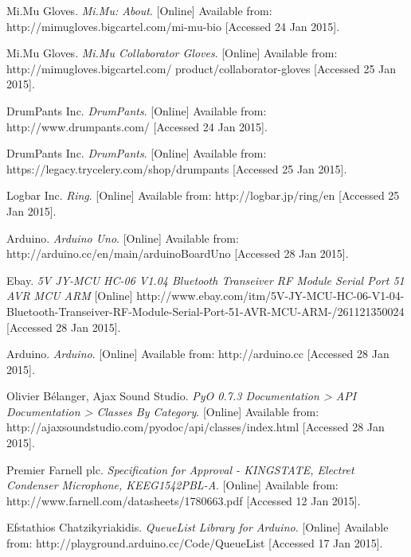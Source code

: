 
\begin{thebibliography}{99}

    Mi.Mu Gloves. \emph{Mi.Mu: About}. [Online] Available from: http://mimugloves.bigcartel.com/mi-mu-bio [Accessed 24 Jan 2015].
    
    Mi.Mu Gloves. \emph{Mi.Mu Collaborator Gloves}. [Online] Available from:  http://mimugloves.bigcartel.com/
    product/collaborator-gloves [Accessed 25 Jan 2015].
    
    DrumPants Inc. \emph{DrumPants}. [Online] Available from: http://www.drumpants.com/ [Accessed 24 Jan 2015].

    DrumPants Inc. \emph{DrumPants}. [Online] Available from: https://legacy.trycelery.com/shop/drumpants [Accessed 25 Jan 2015].

    Logbar Inc. \emph{Ring}. [Online] Available from: http://logbar.jp/ring/en [Accessed 25 Jan 2015].
    

    Arduino. \emph{Arduino Uno}. [Online] Available from: http://arduino.cc/en/main/arduinoBoardUno [Accessed 28 Jan 2015].
    
    Ebay. \emph{5V JY-MCU HC-06 V1.04 Bluetooth Transeiver RF Module Serial Port 51 AVR MCU ARM} [Online] http://www.ebay.com/itm/5V-JY-MCU-HC-06-V1-04-Bluetooth-Transeiver-RF-Module-Serial-Port-51-AVR-MCU-ARM-/261121350024 [Accessed 28 Jan 2015].
    
    Arduino. \emph{Arduino}. [Online] Available from: http://arduino.cc [Accessed 28 Jan 2015].

    Olivier B\'{e}langer, Ajax Sound Studio. \emph{PyO 0.7.3 Documentation > API Documentation > Classes By Category}. [Online] Available from: http://ajaxsoundstudio.com/pyodoc/api/classes/index.html [Accessed 28 Jan 2015].


    Premier Farnell plc. \emph{Specification for Approval - KINGSTATE, Electret Condenser Microphone, KEEG1542PBL-A}. [Online] Available from: http://www.farnell.com/datasheets/1780663.pdf [Accessed 12 Jan 2015].



    Efstathios Chatzikyriakidis. \emph{QueueList Library for Arduino}. [Online] Available from: http://playground.arduino.cc/Code/QueueList [Accessed 17 Jan 2015].


\end{thebibliography}

